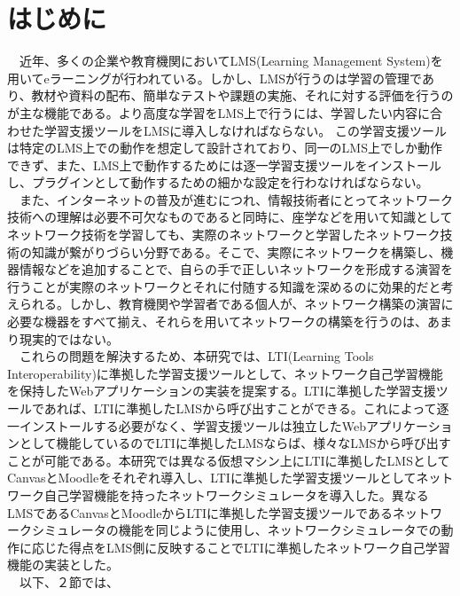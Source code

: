 \section{はじめに}
\label{tag:first}

　近年、多くの企業や教育機関においてLMS(Learning Management System)を用いてeラーニングが行われている。しかし、LMSが行うのは学習の管理であり、教材や資料の配布、簡単なテストや課題の実施、それに対する評価を行うのが主な機能である。より高度な学習をLMS上で行うには、学習したい内容に合わせた学習支援ツールをLMSに導入しなければならない。
この学習支援ツールは特定のLMS上での動作を想定して設計されており、同一のLMS上でしか動作できず、また、LMS上で動作するためには逐一学習支援ツールをインストールし、プラグインとして動作するための細かな設定を行わなければならない。\\
　また、インターネットの普及が進むにつれ、情報技術者にとってネットワーク技術への理解は必要不可欠なものであると同時に、座学などを用いて知識としてネットワーク技術を学習しても、実際のネットワークと学習したネットワーク技術の知識が繋がりづらい分野である。そこで、実際にネットワークを構築し、機器情報などを追加することで、自らの手で正しいネットワークを形成する演習を行うことが実際のネットワークとそれに付随する知識を深めるのに効果的だと考えられる。しかし、教育機関や学習者である個人が、ネットワーク構築の演習に必要な機器をすべて揃え、それらを用いてネットワークの構築を行うのは、あまり現実的ではない。\\
　これらの問題を解決するため、本研究では、LTI(Learning Tools Interoperability)に準拠した学習支援ツールとして、ネットワーク自己学習機能を保持したWebアプリケーションの実装を提案する。LTIに準拠した学習支援ツールであれば、LTIに準拠したLMSから呼び出すことができる。これによって逐一インストールする必要がなく、学習支援ツールは独立したWebアプリケーションとして機能しているのでLTIに準拠したLMSならば、様々なLMSから呼び出すことが可能である。本研究では異なる仮想マシン上にLTIに準拠したLMSとしてCanvasとMoodleをそれぞれ導入し、LTIに準拠した学習支援ツールとしてネットワーク自己学習機能を持ったネットワークシミュレータを導入した。異なるLMSであるCanvasとMoodleからLTIに準拠した学習支援ツールであるネットワークシミュレータの機能を同じように使用し、ネットワークシミュレータでの動作に応じた得点をLMS側に反映することでLTIに準拠したネットワーク自己学習機能の実装とした。\\
　以下、２節では、
